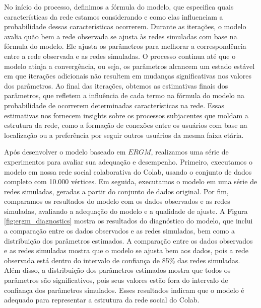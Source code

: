 No início do processo, definimos a fórmula do modelo, que especifica quais características da rede estamos considerando e como elas influenciam a probabilidade dessas características ocorrerem. Durante as iterações, o modelo avalia quão bem a rede observada se ajusta às redes simuladas com base na fórmula do modelo. Ele ajusta os parâmetros para melhorar a correspondência entre a rede observada e as redes simuladas. O processo continua até que o modelo atinja a convergência, ou seja, os parâmetros alcancem um estado estável em que iterações adicionais não resultem em mudanças significativas nos valores dos parâmetros. Ao final das iterações, obtemos as estimativas finais dos parâmetros, que refletem a influência de cada termo na fórmula do modelo na probabilidade de ocorrerem determinadas características na rede. Essas estimativas nos fornecem insights sobre os processos subjacentes que moldam a estrutura da rede, como a formação de conexões entre os usuários com base na localização ou a preferência por seguir outros usuários da mesma faixa etária.

Após desenvolver o modelo baseado em $ERGM$, realizamos uma série de experimentos para avaliar sua adequação e desempenho. Primeiro, executamos o modelo em nossa rede social colaborativa do Colab, usando o conjunto de dados completo com 10.000 vértices. Em seguida, executamos o modelo em uma série de redes simuladas, geradas a partir do conjunto de dados original. Por fim, comparamos os resultados do modelo com os dados observados e as redes simuladas, avaliando a adequação do modelo e a qualidade de ajuste. A Figura \ref{fig:ergm_diagnostics} mostra os resultados do diagnóstico do modelo, que inclui a comparação entre os dados observados e as redes simuladas, bem como a distribuição dos parâmetros estimados. A comparação entre os dados observados e as redes simuladas mostra que o modelo se ajusta bem aos dados, pois a rede observada está dentro do intervalo de confiança de 85\% das redes simuladas. Além disso, a distribuição dos parâmetros estimados mostra que todos os parâmetros são significativos, pois seus valores estão fora do intervalo de confiança dos parâmetros simulados. Esses resultados indicam que o modelo é adequado para representar a estrutura da rede social do Colab.

